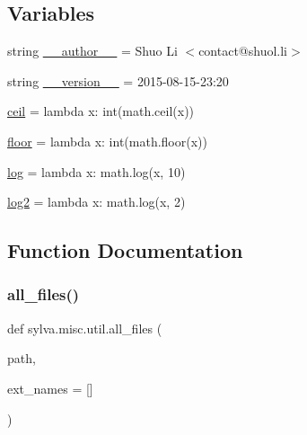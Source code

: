 \subsection*{Variables}
\begin{DoxyCompactItemize}
\item 
string \hyperlink{namespacesylva_1_1misc_1_1util_a1111366860ec15b68260a43ac632d257}{\+\_\+\+\_\+author\+\_\+\+\_\+} = \textquotesingle{}Shuo Li $<$contact@shuol.\+li$>$\textquotesingle{}
\item 
string \hyperlink{namespacesylva_1_1misc_1_1util_aa458ed92c21a116abe2d5f9ab81a2125}{\+\_\+\+\_\+version\+\_\+\+\_\+} = \textquotesingle{}2015-\/08-\/15-\/23\+:20\textquotesingle{}
\item 
\hyperlink{namespacesylva_1_1misc_1_1util_ae24a7e9d1f4709e04a181e488d3e7e96}{ceil} = lambda x\+: int(math.\+ceil(x))
\item 
\hyperlink{namespacesylva_1_1misc_1_1util_aa02f5d131cb4bc9ad1c277a7b0c76885}{floor} = lambda x\+: int(math.\+floor(x))
\item 
\hyperlink{namespacesylva_1_1misc_1_1util_ab3731c524403f8c49cdb518af558d408}{log} = lambda x\+: math.\+log(x, 10)
\item 
\hyperlink{namespacesylva_1_1misc_1_1util_a6ac1d560ffdd426fb10172ea106318a0}{log2} = lambda x\+: math.\+log(x, 2)
\end{DoxyCompactItemize}


\subsection{Function Documentation}
\mbox{\label{namespacesylva_1_1misc_1_1util_a5dfe1979a130725652883d277a24ee5d}} 
\subsubsection{\texorpdfstring{all\+\_\+files()}{all\_files()}}
{\footnotesize\ttfamily def sylva.\+misc.\+util.\+all\+\_\+files (\begin{DoxyParamCaption}\item[{}]{path,  }\item[{}]{ext\+\_\+names = {\ttfamily \mbox{[}\mbox{]}} }\end{DoxyParamCaption})}



